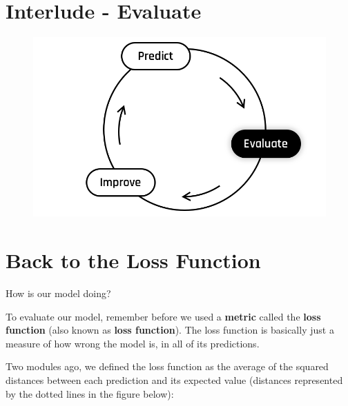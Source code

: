 
\section*{Interlude - Evaluate}

\begin{figure}[!h]
    \centering
    \includegraphics[scale=0.25]{assets/Evaluate.png}
\end{figure}


\section*{Back to the Loss Function}
How is our model doing?  

To evaluate our model, remember before we used a \textbf{metric} called the \textbf{loss function} (also known as \textbf{loss function}).
The loss function is basically just a measure of how wrong the model is, in all of its predictions.

Two modules ago, we defined the loss function as the average of the squared distances between each prediction and its expected value (distances represented by the dotted lines in the figure below):

